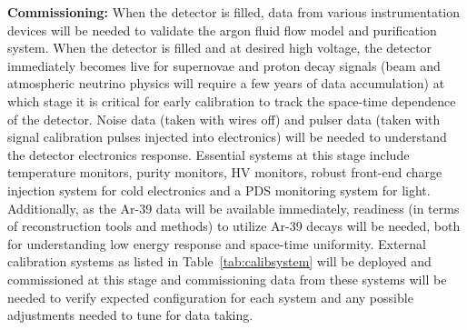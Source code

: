 \textbf{Commissioning:} When the detector is filled, data from various instrumentation devices will be needed to validate the argon fluid flow model and purification system. When the detector is filled and at desired high voltage, the detector immediately becomes live for supernovae and proton decay signals (beam and atmospheric neutrino physics will require a few years of data accumulation) at which stage it is critical for early calibration to track the space-time dependence of the detector. Noise data (taken with wires off) and pulser data (taken with signal calibration pulses injected into electronics) will be needed to understand the detector electronics response. Essential systems at this stage include temperature monitors, purity monitors, HV monitors, robust front-end charge injection system for cold electronics and a PDS monitoring system for light. Additionally, as the Ar-39 data will be available immediately, readiness (in terms of reconstruction tools and methods) to utilize Ar-39 decays will be needed, both for understanding low energy response and space-time uniformity. External calibration systems as listed in Table~\ref{tab:calibsystem} will be deployed and commissioned at this stage and commissioning data from these systems will be needed to verify expected configuration for each system and any possible adjustments needed to tune for data taking.


